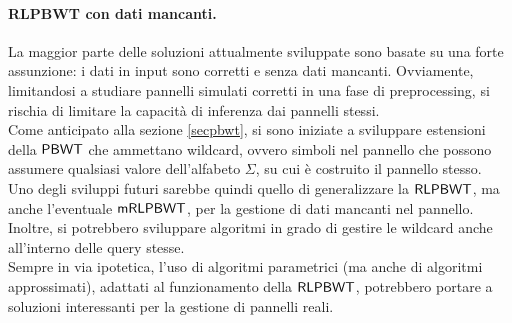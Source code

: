 \paragraph{RLPBWT con dati mancanti.}
La maggior parte delle soluzioni attualmente sviluppate sono basate su una forte
assunzione: i dati in input sono corretti e senza dati mancanti. Ovviamente,
limitandosi a studiare pannelli simulati corretti in una fase di
preprocessing, si rischia di limitare la capacità di inferenza dai pannelli
stessi.\\ 
Come anticipato alla sezione \ref{secpbwt}, si sono iniziate a sviluppare
estensioni della $\mbox{\rm {\sf PBWT}}$ che ammettano wildcard, ovvero simboli nel
pannello che possono assumere qualsiasi valore dell'alfabeto $\Sigma$, su cui è
costruito il pannello stesso.\\
Uno degli sviluppi futuri sarebbe quindi quello di generalizzare la
$\mbox{\rm {\sf RLPBWT}}$, ma anche l'eventuale $\mbox{\rm {\sf mRLPBWT}}$, per la gestione di dati
mancanti nel pannello. Inoltre, si potrebbero sviluppare algoritmi in grado di
gestire le wildcard anche all'interno delle query stesse.\\
Sempre in via ipotetica, l'uso di algoritmi parametrici (ma anche
di algoritmi approssimati), adattati al
funzionamento della $\mbox{\rm {\sf RLPBWT}}$, potrebbero portare a soluzioni interessanti
per la gestione di pannelli reali.
